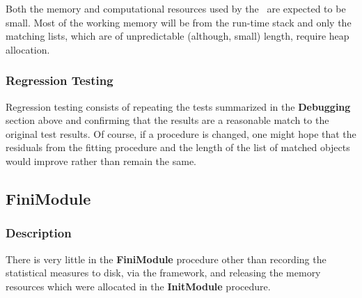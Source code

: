 Both the memory and computational resources used by the \mcm\ are expected to
be small.
Most of the working memory will be from the run-time stack and only the
matching lists, which are of unpredictable (although, small) length, require
heap allocation.

\subsubsection{Regression Testing}

Regression testing consists of repeating the tests summarized in the {\bf
Debugging} section above and confirming that the results are a reasonable match
to the original test results.
Of course, if a procedure is changed, one might hope that the residuals from
the fitting procedure and the length of the list of matched objects would
improve rather than remain the same.

\subsection{FiniModule}

\subsubsection{Description}

There is very little in the {\bf FiniModule} procedure other than recording the
statistical measures to disk, via the framework, and releasing the memory
resources which were allocated in the {\bf InitModule} procedure.
\renewcommand{\labelitemii}{\pbf--}

